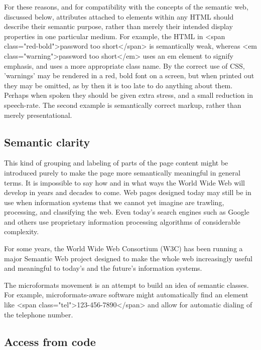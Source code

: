 For these reasons, and for compatibility with the concepts of the semantic web, discussed below, attributes attached to elements within any HTML should describe their semantic purpose, rather than merely their intended display properties in one particular medium. For example, the HTML in <span class="red-bold">password too short</span> is semantically weak, whereas <em class="warning">password too short</em> uses an em element to signify emphasis, and uses a more appropriate class name. By the correct use of CSS, 'warnings' may be rendered in a red, bold font on a screen, but when printed out they may be omitted, as by then it is too late to do anything about them. Perhaps when spoken they should be given extra stress, and a small reduction in speech-rate. The second example is semantically correct markup, rather than merely presentational.





\subsection{Semantic clarity}

This kind of grouping and labeling of parts of the page content might be introduced purely to make the page more semantically meaningful in general terms. It is impossible to say how and in what ways the World Wide Web will develop in years and decades to come. Web pages designed today may still be in use when information systems that we cannot yet imagine are trawling, processing, and classifying the web. Even today's search engines such as Google and others use proprietary information processing algorithms of considerable complexity.

For some years, the World Wide Web Consortium (W3C) has been running a major Semantic Web project designed to make the whole web increasingly useful and meaningful to today's and the future's information systems.

The microformats movement is an attempt to build an idea of semantic classes. For example, microformats-aware software might automatically find an element like <span class="tel">123-456-7890</span> and allow for automatic dialing of the telephone number.



\subsection{Access from code}

